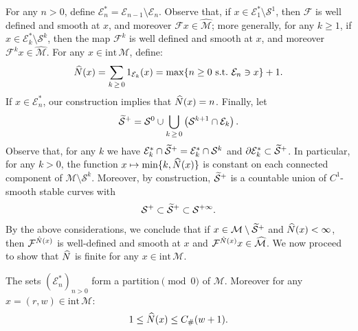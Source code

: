 \documentclass[AHL, Unicode, longabstracts,published]{cedram}
\newcommand{\st}{\ \text{s.t.}\ }
\newcommand{\intr}[1]{\mathrm{int}\,#1}
\newcommand{\cE}{\mathcal E}
\newcommand{\cEs}{\mathcal E^{*}}
\newcommand{\cm}{\mathcal{F}}
\newcommand{\csp}{\mathcal{M}}
\newcommand{\cspi}{\widehat{\csp}}
\newcommand{\singPrivate}{\mathcal{S}}
\newcommand{\sing}[1]{\singPrivate^{#1}}
\newcommand{\singForward}[1]{\singPrivate^+_{#1}}
\newcommand{\singt}[1]{\tilde{\singPrivate}^{#1}}
\newcommand{\Np}{\hat N}
\newcommand{\Const}{C_\#}
\let\oldtilde\tilde
\renewcommand*{\tilde}[1]{\mathchoice{\widetilde{#1}}{\widetilde{#1}}{\oldtilde{#1}}{\oldtilde{#1}}}
\let\oldhat\hat
\renewcommand*{\hat}[1]{\mathchoice{\widehat{#1}}{\widehat{#1}}{\oldhat{#1}}{\oldhat{#1}}}
\begin{document}
For any $n > 0$, define $\cEs_n = \cE_{n-1}\setminus\cE_{n}$. Observe that, if $x\in\cEs_1\setminus\sing{1}$, then $\cm$ is well defined and smooth at $x$, and moreover $\cm x\in\cspi$; more generally, for any $k\ge 1$, if $x\in\cEs_{k}\setminus\sing{k}$, then the map $\cm^k$ is well defined and smooth at $x$, and moreover $\cm^kx\in\cspi$. For any $x\in\intr\csp$, define:
\begin{align*}
\Np(x) = \sum_{k\,\ge\,0} 1_{\cE_k}(x) = \max\{n\ge0\st \cE_n\ni x\} +1.
\end{align*}
If $x\in\cEs_n$, our construction implies that $\Np(x) = n$. Finally, let
\begin{align*}
\singt+ = \sing0\cup \bigcup_{k\,\ge\,0} \left(\sing{k+1}\cap \cE_k\right).
\end{align*}
Observe that, for any $k$ we have $\cEs_{k}\cap\singt+ = \cEs_{k}\cap\sing{k}$ and $\partial\cEs_{k}\subset\singt+$. In particular, for any $k > 0$, the function $x\mapsto\min\{k,\Np(x)\}$ is constant on each connected component of $\csp\setminus\sing{k}$. Moreover, by construction, $\singt+$ is a countable union of $C^1$-smooth stable curves with
\begin{align*}
\singForward{}\subset\singt+\subset\sing{+\infty}.
\end{align*}
By the above considerations, we conclude that if $x\in\csp\setminus\singt+$ and $\Np(x) < \infty$, then $\cm^{\Np(x)}$ is well-defined and smooth at $x$ and $\cm^{\Np(x)}x\in\cspi$. We now proceed to show that $\Np$ is finite for any $x\in\intr\csp$.
\begin{lemm} \label{LmFRet}
The sets $(\cEs_n)_{n > 0}$ form a partition$\pmod0$ of $\csp.$ Moreover for any $x = (r,w)\in\intr\csp$:
\begin{align}\label{e_weakBoundOnNp}
1\le\Np(x)\le \Const (w+1).
\end{align}
\end{lemm}
\end{document}

